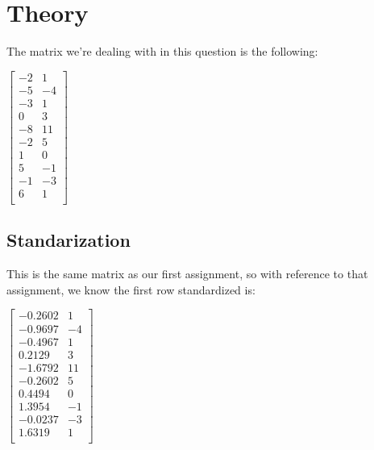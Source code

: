 \documentclass[12pt]{article}
\begin{document}
\maketitle

\newpage
\section{Theory}
\noindent
The matrix we're dealing with in this question is the following:

\begin{center}
    $\begin{bmatrix}
        -2 & 1\\
        -5 & -4\\
        -3 & 1\\
        0 & 3\\
        -8 & 11\\
        -2 & 5\\
        1 & 0\\
        5 & -1\\
        -1 & -3\\
        6 & 1\\
    \end{bmatrix}$
\end{center}

\subsection{Standarization}

\noindent
This is the same matrix as our first assignment, so with reference to that assignment, we know the first row standardized is:

\begin{center}
    $\begin{bmatrix}
        -0.2602 & 1\\
        -0.9697 & -4\\
        -0.4967 & 1\\
        0.2129 & 3\\
        -1.6792 & 11\\
        -0.2602 & 5\\
        0.4494 & 0\\
        1.3954 & -1\\
        -0.0237 & -3\\
        1.6319 & 1\\
    \end{bmatrix}$
\end{center}
\end{document}
